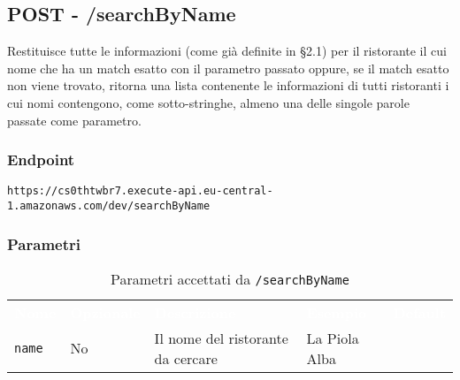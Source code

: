 \subsection{POST - /searchByName} 
Restituisce tutte le informazioni (come già definite in §2.1) per il ristorante il cui nome che ha un match esatto con il parametro passato oppure, se il match esatto non viene trovato, ritorna una lista contenente le informazioni di tutti ristoranti i cui nomi contengono, come sotto-stringhe, almeno una delle singole parole passate come parametro. 


\subsubsection{Endpoint}
\texttt{https://cs0thtwbr7.execute-api.eu-central-1.amazonaws.com/dev/searchByName}

\subsubsection{Parametri}
\begin{table}[!htbp]
\renewcommand{\arraystretch}{1.5}

\begin{tabular}[t]{ m{}<{\centering}  m{}<{\centering} m{}<{\centering} m{}<{\centering}  m{}<{\centering} }
	\rowcolor{darkblue}
	\textcolor{white}{\textbf{Nome}} &\textcolor{white}{\textbf{Opzionale}} &\textcolor{white}{\textbf{Descrizione}} &\textcolor{white}{\textbf{Esempio}} &\textcolor{white}{\textbf{Default}} \\ 
\texttt{name} & No & Il nome del ristorante da cercare & La Piola Alba &  \\

\end{tabular}
\caption{Parametri accettati da \texttt{/searchByName}}
\end{table}

